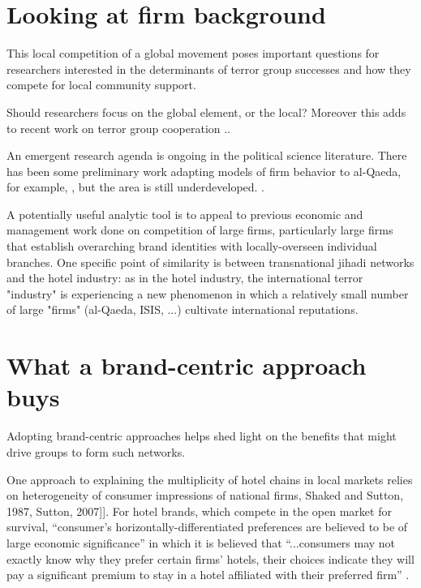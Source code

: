 \documentclass{article}
\begin{document}
\section{Looking at firm background}

This local competition of a global movement poses important questions
for researchers interested in the determinants of terror group
successes and how they compete for local community support. 

Should researchers focus on the global element, or the local? Moreover this
adds to recent work on terror group cooperation ..

An emergent research agenda is ongoing in the political science
literature. There has been some preliminary work adapting models of
firm behavior to al-Qaeda, for example, \cite{zelinsky2009research},
but the area is still underdeveloped.
.%

A potentially useful analytic tool is to appeal to previous economic
and management work done on competition of large firms, particularly
large firms that establish overarching brand identities with
locally-overseen individual branches. One specific point of similarity is between transnational jihadi networks and
the hotel industry: as in the hotel industry, the international terror
"industry" is experiencing a new phenomenon in which a relatively small
number of large "firms" (al-Qaeda, ISIS, ...) cultivate
international reputations. 



\section{What a brand-centric approach buys}

Adopting brand-centric approaches helps shed light on the benefits
that might drive groups to form such networks. 

One approach to explaining the multiplicity of hotel chains in local
markets relies on heterogeneity of consumer impressions of national
firms, \cite{Wilson2011branding}Shaked and Sutton, 1987, Sutton,
2007]]. For hotel brands, which compete in the open market for
survival, ``consumer's horizontally-differentiated preferences are
believed to be of large economic significance'' in which it is
believed that ``...consumers may not exactly know why they prefer
certain firms’ hotels, their choices indicate they will pay a
significant premium to stay in a hotel affiliated with their preferred
firm'' \cite{wilson2011branding}.
\end{document}
